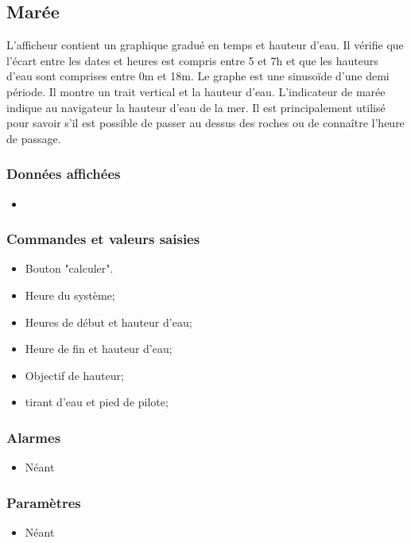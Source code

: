 \documentclass[a4paper,11pt]{report}
\begin{document}
\subsection{Marée}
L'afficheur contient un graphique gradué en temps et hauteur d'eau.
Il vérifie que l'écart entre les dates et heures est compris entre 5 et 7h
et que les hauteurs d'eau sont comprises entre 0m et 18m.
Le graphe est une sinusoïde d'une demi période.
Il montre un trait vertical et la hauteur d'eau.
L'indicateur de marée indique au navigateur la hauteur d'eau de la mer.
Il est principalement utilisé pour savoir s'il est possible de passer
au dessus des roches ou de connaître l'heure de passage.


\subsubsection{Données affichées}
\begin{itemize}
   \item 	
\end{itemize}

\subsubsection{Commandes et valeurs saisies}
\begin{itemize}
	\item Bouton "calculer".
	\item Heure du système;
    \item Heures de début et hauteur d'eau;
    \item Heure de fin et hauteur d'eau;
    \item Objectif de hauteur;
    \item tirant d'eau et pied de pilote;
\end{itemize}

\subsubsection{Alarmes}
\begin{itemize}
	\item Néant
\end{itemize}

\subsubsection{Paramètres}
\begin{itemize}
	\item Néant
\end{itemize}
\end{document}
